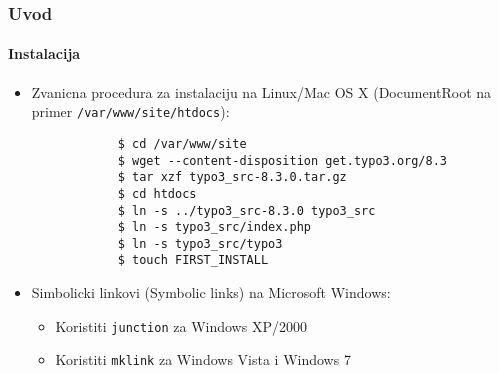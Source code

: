 \begin{frame}[fragile]
	\frametitle{Uvod}
	\framesubtitle{Instalacija}

	\begin{itemize}
		\item Zvanicna procedura za instalaciju na Linux/Mac OS X\newline
			(DocumentRoot na primer \texttt{/var/www/site/htdocs}):
		\begin{lstlisting}
			$ cd /var/www/site
			$ wget --content-disposition get.typo3.org/8.3
			$ tar xzf typo3_src-8.3.0.tar.gz
			$ cd htdocs
			$ ln -s ../typo3_src-8.3.0 typo3_src
			$ ln -s typo3_src/index.php
			$ ln -s typo3_src/typo3
			$ touch FIRST_INSTALL
		\end{lstlisting}

		\item Simbolicki linkovi (Symbolic links) na Microsoft Windows:

			\begin{itemize}
				\item Koristiti \texttt{junction} za Windows XP/2000
				\item Koristiti \texttt{mklink} za Windows Vista i Windows 7
			\end{itemize}

	\end{itemize}
\end{frame}

